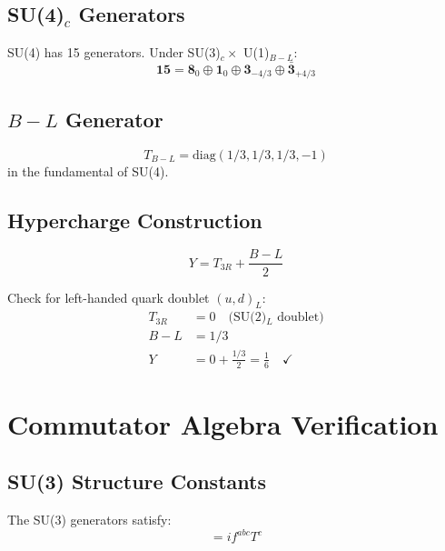 \documentclass[11pt,a4paper]{article}
\begin{document}
\subsection{SU(4)$_c$ Generators}

SU(4) has 15 generators. Under SU(3)$_c \times$ U(1)$_{B-L}$:
\begin{equation}
  \mathbf{15} = \mathbf{8}_0 \oplus \mathbf{1}_0 \oplus \mathbf{3}_{-4/3}
    \oplus \bar{\mathbf{3}}_{+4/3}
  \label{eq:app-su4-decomp}
\end{equation}

\subsection{$B-L$ Generator}

\begin{equation}
  T_{B-L} = \text{diag}(1/3, 1/3, 1/3, -1)
  \label{eq:app-b-l-gen}
\end{equation}
in the fundamental of SU(4).

\subsection{Hypercharge Construction}

\begin{equation}
  Y = T_{3R} + \frac{B-L}{2}
  \label{eq:app-hypercharge-ps}
\end{equation}

Check for left-handed quark doublet $(u, d)_L$:
\begin{align}
  T_{3R} &= 0 \quad \text{(SU(2)$_L$ doublet)}
  \label{eq:app-t3r-check} \\
  B-L &= 1/3
  \label{eq:app-bl-check} \\
  Y &= 0 + \frac{1/3}{2} = \frac{1}{6} \quad \checkmark
  \label{eq:app-y-check}
\end{align}

\section{Commutator Algebra Verification}
\label{app:commutators}

\subsection{SU(3) Structure Constants}

The SU(3) generators satisfy:
\begin{equation}
  [T^a, T^b] = i f^{abc} T^c
  \label{eq:app-su3-commutator}
\end{equation}
\end{document}
